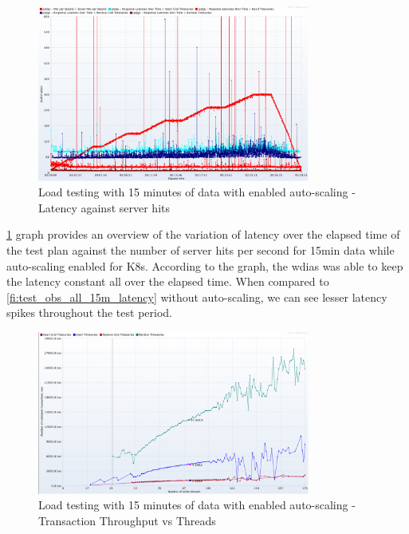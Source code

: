 \begin{figure}[htp]
    \centering
    \includegraphics[width=0.8\textwidth]{results/obs/all_auto/obs_all_auto_15m_res_latencies_against_hits.png}
    \caption{Load testing with 15 minutes of data with enabled auto-scaling - Latency against server hits}
    \label{fi:test_obs_all_auto_15m_latency}
\end{figure}
\cref{fi:test_obs_all_auto_15m_latency} graph provides an overview of the variation of latency over the elapsed time of the test plan against the number of server hits per second for 15min data while auto-scaling enabled for K8s. According to the graph, the \acrshort{wdias} was able to keep the latency constant all over the elapsed time.
When compared to \cref{fi:test_obs_all_15m_latency} without auto-scaling, we can see lesser latency spikes throughout the test period.

\begin{figure}[htp]
    \centering
    \includegraphics[width=0.8\textwidth]{results/obs/all_auto/obs_all_auto_15m_transaction_throughtput_vs_threads.png}
    \caption{Load testing with 15 minutes of data with enabled auto-scaling - Transaction Throughput vs Threads}
    \label{fi:test_obs_all_auto_15m_throughtput}
\end{figure}

